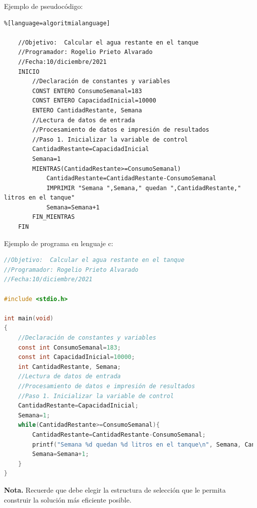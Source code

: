 \documentclass[spanish,11pt,twoside]{article}
\newcommand{\rocketbox}[1]{
	\awesomebox[uasblue]{2pt}{\faRocket}{uasblue}{#1}
}
\begin{document}
\vspace{120px}
\newpage
Ejemplo de pseudocódigo:
\begin{lstlisting}%[language=algoritmialanguage]
	
	//Objetivo:  Calcular el agua restante en el tanque 
	//Programador: Rogelio Prieto Alvarado
	//Fecha:10/diciembre/2021
	INICIO
		//Declaración de constantes y variables
		CONST ENTERO ConsumoSemanal=183
		CONST ENTERO CapacidadInicial=10000
		ENTERO CantidadRestante, Semana
		//Lectura de datos de entrada
		//Procesamiento de datos e impresión de resultados
		//Paso 1. Inicializar la variable de control
		CantidadRestante=CapacidadInicial
		Semana=1
		MIENTRAS(CantidadRestante>=ConsumoSemanal)
			CantidadRestante=CantidadRestante-ConsumoSemanal
			IMPRIMIR "Semana ",Semana," quedan ",CantidadRestante," litros en el tanque"
			Semana=Semana+1
		FIN_MIENTRAS
	FIN
\end{lstlisting}


Ejemplo de programa en lenguaje c:
\begin{lstlisting}[language=C]
//Objetivo:  Calcular el agua restante en el tanque 
//Programador: Rogelio Prieto Alvarado
//Fecha:10/diciembre/2021
	
#include <stdio.h>

int main(void)
{
	//Declaración de constantes y variables
	const int ConsumoSemanal=183;
	const int CapacidadInicial=10000;
	int CantidadRestante, Semana;
	//Lectura de datos de entrada
	//Procesamiento de datos e impresión de resultados
	//Paso 1. Inicializar la variable de control
	CantidadRestante=CapacidadInicial;
	Semana=1;
	while(CantidadRestante>=ConsumoSemanal){
		CantidadRestante=CantidadRestante-ConsumoSemanal;
		printf("Semana %d quedan %d litros en el tanque\n", Semana, CantidadRestante);
		Semana=Semana+1;
	}
}
\end{lstlisting}



\begin{noteblock} %
	\textcolor{uasblue}{\textbf{\textsf{Nota.}}} Recuerde que debe elegir la estructura de selección que le permita construir la solución más eficiente posible. 
	
\end{noteblock}



\vspace{120px}
\end{document}
